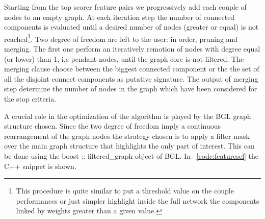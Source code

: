 \documentclass{standalone}
\begin{document}
Starting from the top scorer feature pairs we progressively add each couple of nodes to an empty graph.
At each iteration step the number of connected components is evaluated until a desired number of nodes (greater or equal) is not reached\footnote{
  This procedure is quite similar to put a threshold value on the couple performances or just simpler highlight inside the full network the components linked by weights greater than a given value.
}.
Two degree of freedom are left to the user: in order, \textsf{pruning} and \textsf{merging}.
The first one perform an iteratively remotion of nodes with degree equal (or lower) than 1, i.e pendant nodes, until the graph core is not filtered.
The \textsf{merging} clause choose between the biggest connected component or the the set of all the disjoint connect components as putative signature.
The output of \textsf{merging} step determine the number of nodes in the graph which have been considered for the stop criteria.

A crucial role in the optimization of the algorithm is played by the BGL graph structure chosen.
Since the two degree of freedom imply a continuous rearrangement of the graph nodes the strategy chosen is to apply a filter mask over the main graph structure that highlights the only part of interest.
This can be done using the \textsf{boost :: filtered\_graph} object of BGL.
In ~\ref{code:featuresel} the C++ snippet is shown.
\end{document}
